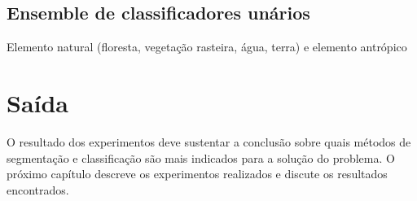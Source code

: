 
\subsection{Ensemble de classificadores unários}


Elemento natural (floresta, vegetação rasteira, água, terra) e elemento antrópico

\section{Saída}

O resultado dos experimentos deve sustentar a conclusão sobre quais métodos de segmentação e classificação são mais indicados para a solução do problema. O próximo capítulo descreve os experimentos realizados e discute os resultados encontrados.